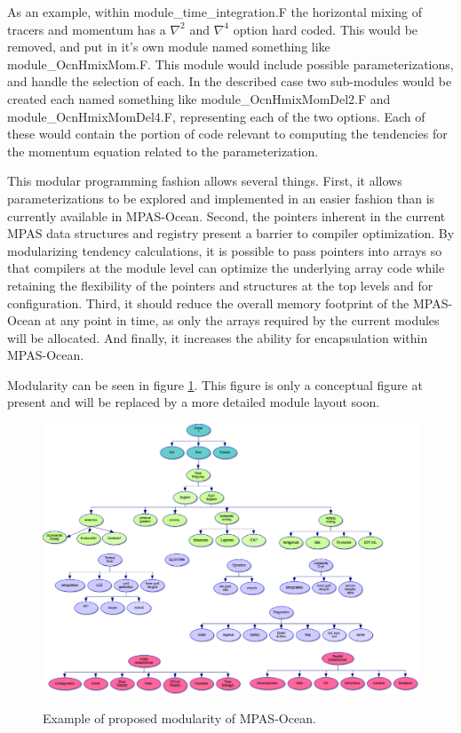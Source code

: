 \documentclass[11pt]{report}
\begin{document}
As an example, within module\_time\_integration.F the horizontal mixing of tracers and momentum has a $\nabla^2$ and $\nabla^4$ option hard coded. This would be removed, and put in it's own module named something like module\_OcnHmixMom.F. This module would include possible parameterizations, and handle the selection of each. In the described case two sub-modules would be created each named something like module\_OcnHmixMomDel2.F and module\_OcnHmixMomDel4.F, representing each of the two options. Each of these would contain the portion of code relevant to computing the tendencies for the momentum equation related to the parameterization.

This modular programming fashion allows several things.  First, it allows parameterizations to be explored and implemented in an easier fashion than is currently available in MPAS-Ocean.  Second, the pointers inherent in the current MPAS data structures and registry present a barrier to compiler optimization.  By modularizing tendency calculations, it is possible to pass pointers into arrays so that compilers at the module level can optimize the underlying array code while retaining the flexibility of the pointers and structures at the top levels and for configuration. 
Third, it should reduce the overall memory footprint of the MPAS-Ocean at any point in time, as only the arrays required by the current modules will be allocated. And finally, it increases the ability for encapsulation within MPAS-Ocean.


Modularity can be seen in figure \ref{fig:modules}.  This figure is only a conceptual figure at present and will be replaced by a more detailed module layout soon.

\begin{figure}
	\includegraphics[scale=0.35]{NewArchitecture.eps}
	\label{fig:modules}
	\caption{Example of proposed modularity of MPAS-Ocean.}
\end{figure}
\end{document}
